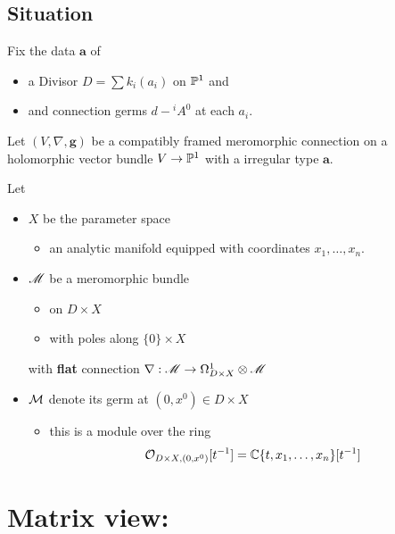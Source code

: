 \subsection{Situation} %
\begin{paracol}{2} %
  Fix the data $\textbf{a}$ of
  \begin{itemize}
    \item a Divisor $D=\sum k_i(a_i)$ on $\P^1$ and
    \item and connection germs $d-{}^iA^0$ at each $a_i$.
  \end{itemize}
  Let $(V,\nabla,\textbf{g})$ be a compatibly framed meromorphic connection on
  a holomorphic vector bundle $V\to\P^1$ with a irregular type $\textbf{a}$.

  \switchcolumn{} %
  Let
  \begin{itemize}
    \item $X$ be the parameter space
      \begin{itemize}
        \item an analytic manifold equipped with coordinates $x_1,\ldots,x_n$.
      \end{itemize}
    \item $\sM$ be a meromorphic bundle
      \begin{itemize}
        \item on $D\times X$
        \item with poles along $\{0\}\times X$
      \end{itemize}
      with \textbf{flat} connection
      $\nabla:\sM\to\Omega_{D\times X}^1\otimes\sM$
    \item $\cM$ denote its germ at $(0,x^0)\in D\times X$
      \begin{itemize}
        \item this is a module over the ring
          \[
            \cO_{D\times X,(0,x^0)}[t^{-1}]=\C\{t,x_1,\dots,x_n\}[t^{-1}]
          \]
      \end{itemize}
  \end{itemize}
\end{paracol} %

\section{Matrix view: \cite{boalch}} %
